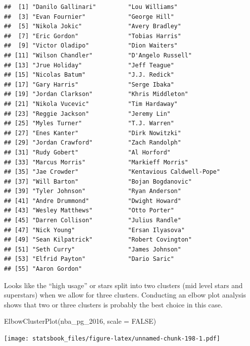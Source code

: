 \documentclass[
]{book}
\newenvironment{Shaded}{\begin{snugshade}}{\end{snugshade}}
\newcommand{\AttributeTok}[1]{\textcolor[rgb]{0.77,0.63,0.00}{#1}}
\newcommand{\ConstantTok}[1]{\textcolor[rgb]{0.00,0.00,0.00}{#1}}
\newcommand{\FunctionTok}[1]{\textcolor[rgb]{0.00,0.00,0.00}{#1}}
\newcommand{\NormalTok}[1]{#1}
\theoremstyle{definition}
\theoremstyle{definition}
\theoremstyle{definition}
\theoremstyle{definition}
\theoremstyle{remark}
\begin{document}
\begin{verbatim}
##  [1] "Danilo Gallinari"         "Lou Williams"            
##  [3] "Evan Fournier"            "George Hill"             
##  [5] "Nikola Jokic"             "Avery Bradley"           
##  [7] "Eric Gordon"              "Tobias Harris"           
##  [9] "Victor Oladipo"           "Dion Waiters"            
## [11] "Wilson Chandler"          "D'Angelo Russell"        
## [13] "Jrue Holiday"             "Jeff Teague"             
## [15] "Nicolas Batum"            "J.J. Redick"             
## [17] "Gary Harris"              "Serge Ibaka"             
## [19] "Jordan Clarkson"          "Khris Middleton"         
## [21] "Nikola Vucevic"           "Tim Hardaway"            
## [23] "Reggie Jackson"           "Jeremy Lin"              
## [25] "Myles Turner"             "T.J. Warren"             
## [27] "Enes Kanter"              "Dirk Nowitzki"           
## [29] "Jordan Crawford"          "Zach Randolph"           
## [31] "Rudy Gobert"              "Al Horford"              
## [33] "Marcus Morris"            "Markieff Morris"         
## [35] "Jae Crowder"              "Kentavious Caldwell-Pope"
## [37] "Will Barton"              "Bojan Bogdanovic"        
## [39] "Tyler Johnson"            "Ryan Anderson"           
## [41] "Andre Drummond"           "Dwight Howard"           
## [43] "Wesley Matthews"          "Otto Porter"             
## [45] "Darren Collison"          "Julius Randle"           
## [47] "Nick Young"               "Ersan Ilyasova"          
## [49] "Sean Kilpatrick"          "Robert Covington"        
## [51] "Seth Curry"               "James Johnson"           
## [53] "Elfrid Payton"            "Dario Saric"             
## [55] "Aaron Gordon"
\end{verbatim}

Looks like the ``high usage'' or stars split into two clusters (mid level stars and superstars) when we allow for three clusters. Conducting an elbow plot analysis shows that two or three clusters is probably the best choice in this case.

\begin{Shaded}
\begin{Highlighting}[]
\FunctionTok{ElbowClusterPlot}\NormalTok{(nba\_pg\_2016, }\AttributeTok{scale =} \ConstantTok{FALSE}\NormalTok{)}
\end{Highlighting}
\end{Shaded}

\texttt{[image: statsbook\_files/figure-latex/unnamed-chunk-198-1.pdf]}
\end{document}
